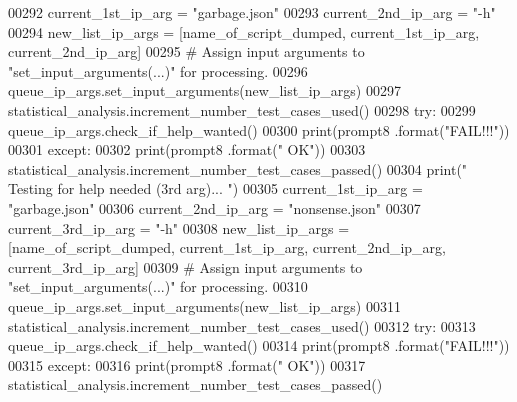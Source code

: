 \begin{DoxyCode}
00292         current\_1st\_ip\_arg = \textcolor{stringliteral}{"garbage.json"}
00293         current\_2nd\_ip\_arg = \textcolor{stringliteral}{"-h"}
00294         new\_list\_ip\_args = [name\_of\_script\_dumped, current\_1st\_ip\_arg, current\_2nd\_ip\_arg]
00295         \textcolor{comment}{#   Assign input arguments to "set\_input\_arguments(...)" for processing.}
00296         queue\_ip\_args.set\_input\_arguments(new\_list\_ip\_args)
00297         statistical\_analysis.increment\_number\_test\_cases\_used()
00298         \textcolor{keywordflow}{try}:
00299             queue\_ip\_args.check\_if\_help\_wanted()
00300             print(prompt8 .format(\textcolor{stringliteral}{"FAIL!!!"}))
00301         \textcolor{keywordflow}{except}:
00302             print(prompt8 .format(\textcolor{stringliteral}{" OK"}))
00303             statistical\_analysis.increment\_number\_test\_cases\_passed()
00304         print(\textcolor{stringliteral}{" Testing for help needed (3rd arg)... "})
00305         current\_1st\_ip\_arg = \textcolor{stringliteral}{"garbage.json"}
00306         current\_2nd\_ip\_arg = \textcolor{stringliteral}{"nonsense.json"}
00307         current\_3rd\_ip\_arg = \textcolor{stringliteral}{"-h"}
00308         new\_list\_ip\_args = [name\_of\_script\_dumped, current\_1st\_ip\_arg, current\_2nd\_ip\_arg, 
      current\_3rd\_ip\_arg]
00309         \textcolor{comment}{#   Assign input arguments to "set\_input\_arguments(...)" for processing.}
00310         queue\_ip\_args.set\_input\_arguments(new\_list\_ip\_args)
00311         statistical\_analysis.increment\_number\_test\_cases\_used()
00312         \textcolor{keywordflow}{try}:
00313             queue\_ip\_args.check\_if\_help\_wanted()
00314             print(prompt8 .format(\textcolor{stringliteral}{"FAIL!!!"}))
00315         \textcolor{keywordflow}{except}:
00316             print(prompt8 .format(\textcolor{stringliteral}{" OK"}))
00317             statistical\_analysis.increment\_number\_test\_cases\_passed()
\end{DoxyCode}
\hypertarget{classutilities_1_1queue__ip__arguments__tester_1_1queue__ip__args__tester_a49bd049dbf616cc1f604d3c0cbe84c43}{}
